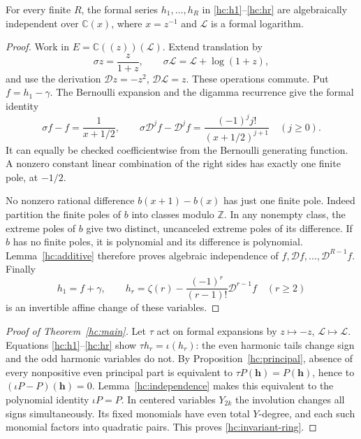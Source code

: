 \begin{lemma}
\label{hc:independence}
For every finite $R$, the formal series $h_1,\ldots,h_R$ in
\eqref{hc:h1}--\eqref{hc:hr} are algebraically independent over
$\mathbb C(x)$, where $x=z^{-1}$ and $\mathcal L$ is a formal logarithm.
\end{lemma}
\begin{proof}
Work in $E=\mathbb C((z))(\mathcal L)$. Extend translation by
\[
 \sigma z=\frac{z}{1+z},\qquad
 \sigma \mathcal L=\mathcal L+\log(1+z),
\]
and use the derivation $\mathcal D z=-z^2$, $\mathcal D \mathcal L=z$.
These operations commute. Put $f=h_1-\gamma$.
The Bernoulli expansion and the digamma recurrence give the formal
identity
\[
 \sigma f-f=\frac1{x+1/2},\qquad
 \sigma\mathcal D^j f-\mathcal D^j f
       =\frac{(-1)^j j!}{(x+1/2)^{j+1}}\quad(j\ge0).
\]
It can equally be checked coefficientwise from the Bernoulli
generating function. A nonzero constant linear combination of the
right sides has exactly one finite pole, at $-1/2$.

No nonzero rational difference $b(x+1)-b(x)$ has just one finite
pole. Indeed partition the finite poles of $b$ into classes modulo
$\mathbb Z$. In any nonempty class, the extreme poles of $b$ give
two distinct, uncanceled extreme poles of its difference. If $b$
has no finite poles, it is polynomial and its difference is
polynomial. Lemma~\ref{hc:additive} therefore proves algebraic
independence of $f,\mathcal Df,\ldots,\mathcal D^{R-1}f$.
Finally
\[
 h_1=f+\gamma,\qquad
 h_r=\zeta(r)-\frac{(-1)^r}{(r-1)!}\mathcal D^{r-1}f\quad(r\ge2)
\]
is an invertible affine change of these variables.
\end{proof}

\begin{proof}[Proof of Theorem~\ref{hc:main}]
Let $\tau$ act on formal expansions by $z\mapsto-z$, $\mathcal L\mapsto \mathcal L$.
Equations \eqref{hc:h1}--\eqref{hc:hr} show
$\tau h_r=\iota(h_r)$: the even harmonic tails change sign and
the odd harmonic variables do not. By
Proposition~\ref{hc:principal}, absence of every nonpositive even
principal part is equivalent to
$\tau P(\mathbf h)=P(\mathbf h)$, hence to
$(\iota P-P)(\mathbf h)=0$. Lemma~\ref{hc:independence} makes
this equivalent to the polynomial identity $\iota P=P$.
In centered variables $Y_{2k}$ the involution changes all signs
simultaneously. Its fixed monomials have even total $Y$-degree,
and each such monomial factors into quadratic pairs. This proves
\eqref{hc:invariant-ring}.
\end{proof}

